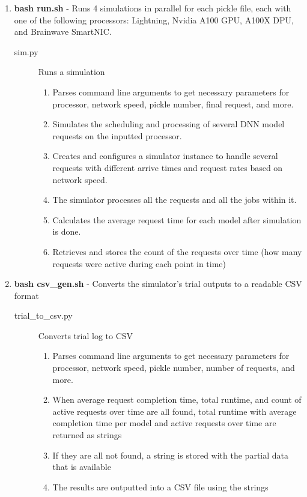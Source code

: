 \documentclass[11pt]{article}
\begin{document}
\begin{enumerate}
    \item \textbf{bash run.sh} - Runs 4 simulations in parallel for each pickle file, each with one of the following processors: Lightning, Nvidia A100 GPU, A100X DPU, and Brainwave SmartNIC.
    \begin{description}
        \item[sim.py] Runs a simulation
        \begin{enumerate}
            \item Parses command line arguments to get necessary parameters for processor, network speed, pickle number, final request, and more.
            \item Simulates the scheduling and processing of several DNN model requests on the inputted processor.
            \item Creates and configures a simulator instance to handle several requests with different arrive times and request rates based on network speed.
            \item The simulator processes all the requests and all the jobs within it.
            \item Calculates the average request time for each model after simulation is done.
            \item Retrieves and stores the count of the requests over time (how many requests were active during each point in time)
            
        \end{enumerate}
    \end{description}

    \item \textbf{bash csv\_gen.sh} - Converts the simulator's trial outputs to a readable CSV format
    \begin{description}
        \item[trial\_to\_csv.py] Converts trial log to CSV
        \begin{enumerate}
            \item Parses command line arguments to get necessary parameters for processor, network speed, pickle number, number of requests, and more.
            \item When average request completion time, total runtime, and count of active requests over time are all found, total runtime with average completion time per model and active requests over time are returned as strings
            \item If they are all not found, a string is stored with the partial data that is available
            \item The results are outputted into a CSV file using the strings
        \end{enumerate}
    \end{description}


\end{enumerate}
\end{document}
